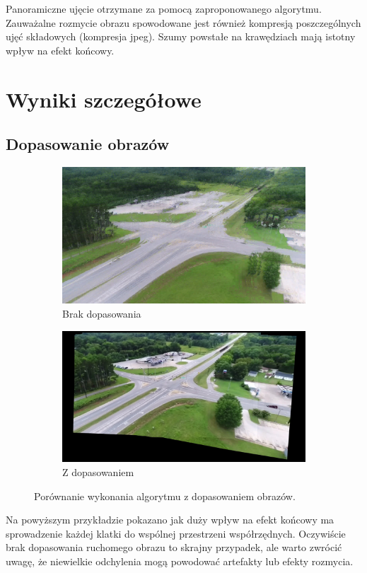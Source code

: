Panoramiczne ujęcie otrzymane za pomocą zaproponowanego algorytmu. Zauważalne rozmycie obrazu spowodowane jest również kompresją poszczególnych ujęć składowych (kompresja jpeg). Szumy powstałe na krawędziach mają istotny wpływ na efekt końcowy.

\section{Wyniki szczegółowe}
\subsection{Dopasowanie obrazów}

\begin{figure}[H]
\centering
\begin{subfigure}{.5\textwidth}
  \centering
  \includegraphics[width=.95\linewidth]{img/non-match.png}
  \caption{Brak dopasowania}
  \label{fig:sub1}
\end{subfigure}%
\begin{subfigure}{.5\textwidth}
  \centering
  \includegraphics[width=.95\linewidth]{img/match.png}
  \caption{Z dopasowaniem}
  \label{fig:sub2}
\end{subfigure}
\caption{Porównanie wykonania algorytmu z dopasowaniem obrazów.}
\label{fig:test}
\end{figure}
Na powyższym przykładzie pokazano jak duży wpływ na efekt końcowy ma sprowadzenie każdej klatki do wspólnej przestrzeni współrzędnych. Oczywiście brak dopasowania ruchomego obrazu to skrajny przypadek, ale warto zwrócić uwagę, że niewielkie odchylenia mogą powodować artefakty lub efekty rozmycia.
